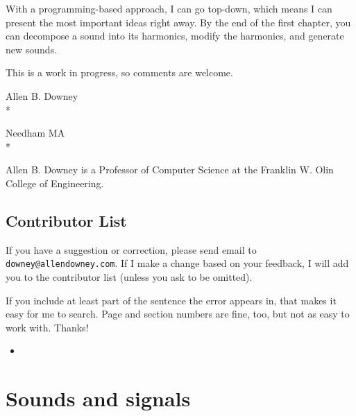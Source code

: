 \documentclass[12pt]{book}
\begin{document}
With a programming-based approach, I can go top-down, which means I
can present the most important ideas right away.  By the end of the
first chapter, you can decompose a sound into its harmonics, modify
the harmonics, and generate new sounds.

This is a work in progress, so comments are welcome.


Allen B. Downey \\*

Needham MA \\*

Allen B. Downey is a Professor of Computer Science at 
the Franklin W. Olin College of Engineering.



\section*{Contributor List}

If you have a suggestion or correction, please send email to 
{\tt downey@allendowney.com}.  If I make a change based on your
feedback, I will add you to the contributor list
(unless you ask to be omitted).

If you include at least part of the sentence the
error appears in, that makes it easy for me to search.  Page and
section numbers are fine, too, but not as easy to work with.
Thanks!

\small

\begin{itemize}

\item 


\end{itemize}

\normalsize

\clearemptydoublepage

\begin{latexonly}

\tableofcontents

\clearemptydoublepage

\end{latexonly}

\mainmatter


\chapter{Sounds and signals}
\label{sounds}
\end{document}
